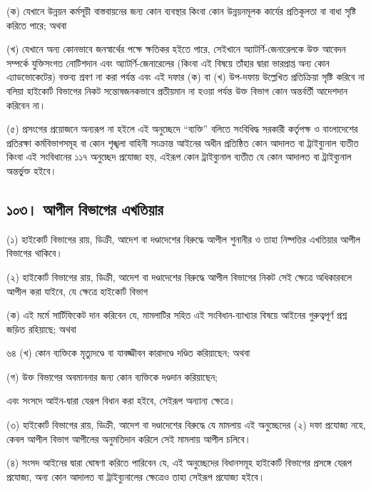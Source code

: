 \documentclass[11pt]{article}
\begin{document}
(ক) যেখানে উন্নয়ন কর্মসূচী বাস্তবায়নের জন্য কোন ব্যবস্থার কিংবা কোন উন্নয়নমূলক
    কার্যের প্রতিকূলতা বা বাধা সৃষ্টি করিতে পারে; অথবা

(খ) যেখানে অন্য কোনভাবে জনস্বার্থের পক্ষে ক্ষতিকর হইতে পারে,
    সেইখানে অ্যাটর্ণি-জেনারেলকে উক্ত আবেদন সম্পর্কে যুক্তিসংগত নোটিশদান এবং
    অ্যাটর্ণি-জেনারেলের (কিংবা এই বিষয়ে তাঁহার দ্বারা ভারপ্রাপ্ত অন্য কোন
    এ্যাডভোকেটের) বক্তব্য শ্রবণ না করা পর্যন্ত এবং এই দফার (ক) বা (খ) উপ-দফায়
    উল্লেখিত প্রতিক্রিয়া সৃষ্টি করিবে না বলিয়া হাইকোর্ট বিভাগের নিকট
    সন্তোষজনকভাবে প্রতীয়মান না হওয়া পর্যন্ত উক্ত বিভাগ কোন অন্তর্বর্তী আদেশদান
    করিবেন না।

(৫) প্রসংগের প্রয়োজনে অন্যরূপ না হইলে এই অনুচ্ছেদে “ব্যক্তি” বলিতে সংবিধিদ্ধ
    সরকারী কর্তৃপক্ষ ও বাংলাদেশের প্রতিরক্ষা কর্মবিভাগসমূহ বা কোন শৃঙ্খলা বাহিনী
    সংক্রান্ত আইনের অধীন প্রতিষ্ঠিত কোন আদালত বা ট্রাইব্যুনাল ব্যতীত কিংবা এই
    সংবিধানের ১১৭ অনুচ্ছেদ প্রযোজ্য হয়, এইরূপ কোন ট্রাইব্যুনাল ব্যতীত যে কোন আদালত
    বা ট্রাইব্যুনাল অন্তর্ভুক্ত হইবে।

\subsection{১০৩। আপীল বিভাগের এখতিয়ার}
\label{sec:org36d0b72}
(১) হাইকোর্ট বিভাগের রায়, ডিক্রী, আদেশ বা দণ্ডাদেশের বিরুদ্ধে আপীল শুনানীর
    ও তাহা নিষ্পত্তির এখতিয়ার আপীল বিভাগের থাকিবে।

(২) হাইকোর্ট বিভাগের রায়, ডিক্রী, আদেশ বা দণ্ডাদেশের বিরুদ্ধে আপীল বিভাগের
    নিকট সেই ক্ষেত্রে অধিকারবলে আপীল করা যাইবে, যে ক্ষেত্রে হাইকোর্ট বিভাগ

(ক) এই মর্মে সার্টিফিকেট দান করিবেন যে, মামলাটির সহিত এই সংবিধান-ব্যাখ্যার
    বিষয়ে আইনের গুরুত্বপূর্ণ প্রশ্ন জড়িত রহিয়াছে; অথবা

৬৪ (খ) কোন ব্যক্তিকে মৃত্যুদণ্ডে বা যাবজ্জীবন কারাদণ্ডে দণ্ডিত করিয়াছেন; অথবা

(গ) উক্ত বিভাগের অবমাননার জন্য কোন ব্যক্তিকে দণ্ডদান করিয়াছেন;

এবং সংসদে আইন-দ্বারা যেরূপ বিধান করা হইবে, সেইরূপ অন্যান্য ক্ষেত্রে।

(৩) হাইকোর্ট বিভাগের রায়, ডিক্রী, আদেশ বা দণ্ডাদেশের বিরুদ্ধে যে মামলায় এই
    অনুচ্ছেদের (২) দফা প্রযোজ্য নহে, কেবল আপীল বিভাগ আপীলের অনুমতিদান করিলে সেই
    মামলায় আপীল চলিবে।

(৪) সংসদ আইনের দ্বারা ঘোষণা করিতে পারিবেন যে, এই অনুচ্ছেদের বিধানসমূহ
    হাইকোর্ট বিভাগের প্রসঙ্গে যেরূপ প্রযোজ্য, অন্য কোন আদালত বা ট্রাইব্যুনালের
    ক্ষেত্রেও তাহা সেইরূপ প্রযোজ্য হইবে।
\end{document}
